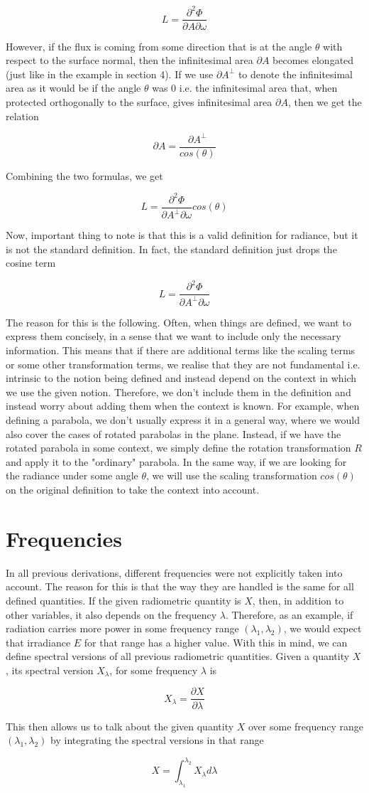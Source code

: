 \documentclass{article}
\begin{document}
\[ L = \frac{\partial^2 \Phi}{\partial A \partial \omega} \]

However, if the flux is coming from some direction that is at the angle $\theta$ with respect to the surface normal, then the infinitesimal area $\partial A$ becomes elongated (just like in the example in section 4). If we use $\partial A^\bot$ to denote the infinitesimal area as it would be if the angle $\theta$ was 0 i.e. the infinitesimal area that, when protected orthogonally to the surface, gives infinitesimal area $\partial A$, then we get the relation

\[ \partial A = \frac{\partial A^\bot}{cos(\theta)} \]

Combining the two formulas, we get

\[ L = \frac{\partial^2 \Phi }{\partial A^\bot \partial \omega} cos(\theta) \]

Now, important thing to note is that this is a valid definition for radiance, but it is not the standard definition. In fact, the standard definition just drops the cosine term

\[ L = \frac{\partial^2 \Phi }{\partial A^\bot \partial \omega} \]

The reason for this is the following. Often, when things are defined, we want to express them concisely, in a sense that we want to include only the necessary information. This means that if there are additional terms like the scaling terms or some other transformation terms, we realise that they are not fundamental i.e. intrinsic to the notion being defined and instead depend on the context in which we use the given notion. Therefore, we don't include them in the definition and instead worry about adding them when the context is known. For example, when defining a parabola, we don't usually express it in a general way, where we would also cover the cases of rotated parabolas in the plane. Instead, if we have the rotated parabola in some context, we simply define the rotation transformation $R$ and apply it to the "ordinary" parabola. In the same way, if we are looking for the radiance under some angle $\theta$, we will use the scaling transformation $cos(\theta)$ on the original definition to take the context into account.

\section{Frequencies}

In all previous derivations, different frequencies were not explicitly taken into account. The reason for this is that the way they are handled is the same for all defined quantities. If the given radiometric quantity is $X$, then, in addition to other variables, it also depends on the frequency $\lambda$. Therefore, as an example, if radiation carries more power in some frequency range $(\lambda_1, \lambda_2)$, we would expect that irradiance $E$ for that range has a higher value. With this in mind, we can define spectral versions of all previous radiometric quantities. Given a quantity $X$, its spectral version $X_\lambda$, for some frequency $\lambda$ is

\[ X_\lambda = \frac{\partial X}{\partial \lambda} \]

This then allows us to talk about the given quantity $X$ over some frequency range $(\lambda_1, \lambda_2)$ by integrating the spectral versions in that range

\[ X = \int_{\lambda_1}^{\lambda_2} X_\lambda d\lambda \]
\end{document}
